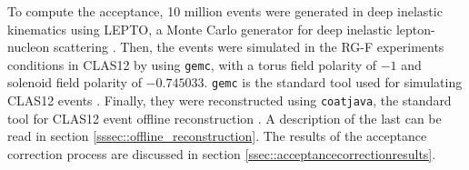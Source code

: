     To compute the acceptance, 10 million events were generated in deep inelastic kinematics using LEPTO, a Monte Carlo generator for deep inelastic lepton-nucleon scattering \cite{ingelman1997}.
    Then, the events were simulated in the RG-F experiments conditions in CLAS12 by using \texttt{gemc}, with a torus field polarity of $-1$ and solenoid field polarity of $-0.745033$.
    \texttt{gemc} is the standard tool used for simulating CLAS12 events \cite{ungaro2020gemc}.
    Finally, they were reconstructed using \texttt{coatjava}, the standard tool for CLAS12 event offline reconstruction \cite{ziegler2020}.
    A description of the last can be read in section \ref{sssec::offline_reconstruction}.
    The results of the acceptance correction process are discussed in section \ref{ssec::acceptancecorrectionresults}.
